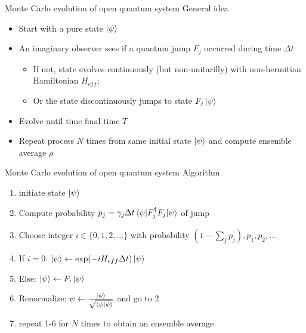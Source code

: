 \documentclass{beamer}
\begin{document}
\begin{frame}{Monte Carlo evolution of open quantum system}
	General idea
	\begin{itemize}
		\item Start with a pure state $\ket{\psi}$ 
		\item An imaginary observer sees if a quantum jump $F_j$ occurred during time $\Delta t$ 
		\begin{itemize}
			\item If not, state evolves continuously (but non-unitarilly) with non-hermitian Hamiltonian $H_{eff}$;
			\item Or the state discontinuously jumps to state $F_j \ket{\psi}$
		\end{itemize}
		\item Evolve until time final time $T$
		\item Repeat process $N$ times from same initial state $\ket{\psi}$ and compute ensemble average $\rho$
	\end{itemize}
\end{frame}


\begin{frame}{Monte Carlo evolution of open quantum system}
		Algorithm 
		\begin{enumerate}
			\item initiate state $\ket{\psi}$
			\item Compute probability $p_j = \gamma_j \Delta t \braket{\psi | F_j^\dagger F_j | \psi} $ of jump
			\item Choose integer $i \in \{0,1,2,...\}$ with probability $(1 - \sum_j p_j), p_1, p_2,...$
			\item If $i = 0$:  $\ket{\psi} \leftarrow \exp(-iH_{eff}\Delta t)\ket{\psi}$
			\item Else: $\ket{\psi} \leftarrow F_i \ket{\psi}$
			\item Renormalize: $\psi \leftarrow \frac{\ket{\psi}}{\sqrt{\braket{\psi|\psi}}}$ and go to 2 
			\item repeat 1-6 for $N$ times to obtain an ensemble average
		\end{enumerate}
\end{frame}
\end{document}
